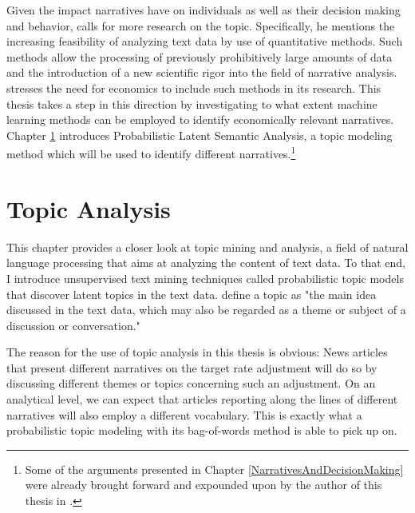 \documentclass[11pt,a4paper,english,oneside]{book}
\numberwithin{equation}{chapter}
\begin{document}
Given the impact narratives have on individuals as well as their decision making and behavior, \citet[pp. 997--999]{Shiller.2017} calls for more research on the topic. Specifically, he mentions the increasing feasibility of analyzing text data by use of quantitative methods. Such methods allow the processing of previously prohibitively large amounts of data and the introduction of a new scientific rigor into the field of narrative analysis. \citet[pp. 997--999]{Shiller.2017} stresses the need for economics to include such methods in its research. 
This thesis takes a step in this direction by investigating to what extent machine learning methods can be employed to identify economically relevant narratives.
Chapter \ref{NLP} introduces Probabilistic Latent Semantic Analysis, a topic modeling method which will be used to identify different narratives.\footnote{Some of the arguments presented in Chapter \ref{NarrativesAndDecisionMaking} were already brought forward and expounded upon by the author of this thesis in \cite{Knoe.2017}.}


\chapter{Topic Analysis}\label{NLP}
This chapter provides a closer look at topic mining and analysis, a field of natural language processing that aims at analyzing the content of text data. To that end, I introduce unsupervised text mining techniques called probabilistic topic models that discover latent topics in the text data. \citet[p.~329]{Zhai.2016} define a topic as "the main idea discussed in the text data, which may also be regarded as a theme or subject of a discussion or conversation."

The reason for the use of topic analysis in this thesis is obvious: News articles that present different narratives on the target rate adjustment will do so by discussing different themes or topics concerning such an adjustment. On an analytical level, we can expect that articles reporting along the lines of different narratives will also employ a different vocabulary. This is exactly what a probabilistic topic modeling with its bag-of-words method is able to pick up on. 
\end{document}
